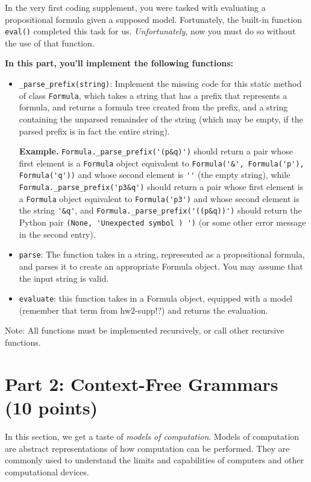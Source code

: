 \documentclass{article}
\begin{document}
\begin{tcolorbox}[enhanced,interior style={top color=Dandelion!20,bottom color=Dandelion!30}]
    In the very first coding supplement, you were tasked with evaluating a propositional formula given a supposed model. Fortunately, the built-in function \lstinline{eval()} completed this task for us. \textit{Unfortunately}, now you must do so without the use of that function.

    
    
    \textbf{In this part, you'll implement the following functions:}
    \begin{itemize}
        \item \lstinline{_parse_prefix(string)}: Implement the missing code for this static method of class \lstinline{Formula}, which takes a string that has a prefix that represents a formula, and returns a formula tree created from the prefix, and a string containing the unparsed remainder of the string (which may be empty, if the parsed prefix is in fact the entire string).

        

        \textbf{Example.} \lstinline{Formula._parse_prefix('(p&q)')} should return a pair whose first element is a \lstinline{Formula} object equivalent to \lstinline{Formula('&', Formula('p'), Formula('q'))} and whose second element is \lstinline{''} (the empty string), while \lstinline{Formula._parse_prefix('p3&q')} should return a pair whose first element is a \lstinline{Formula} object equivalent to \lstinline{Formula('p3')} and whose second element is the string \lstinline{'&q'}, and \lstinline{Formula._parse_prefix('((p&q))')} should return the Python pair \lstinline{(None, 'Unexpected symbol ) ')} (or some other error message in the second entry).
        \item \lstinline{parse}: The function takes in a string, represented as a propositional formula, and parses it to create an appropriate Formula object. You may assume that the input string is valid.
        \item \lstinline{evaluate}: this function takes in a Formula object, equipped with a model (remember that term from hw2-supp!?) and returns the evaluation. 
    \end{itemize}

    Note: All functions must be implemented recursively, or call other recursive functions.
\end{tcolorbox}

\section*{Part 2: Context-Free Grammars (10 points)}
    In this section, we get a taste of \textit{models of computation}. Models of computation are abstract representations of how computation can be performed. They are commonly used to understand the limits and capabilities of computers and other computational devices.
\end{document}

